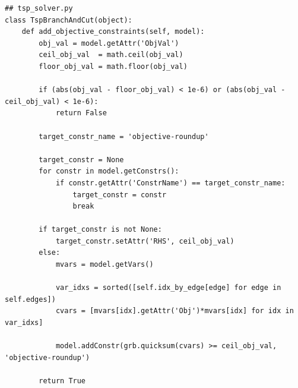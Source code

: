 \documentclass{article}
\begin{document}
\begin{flushleft}
\begin{lstlisting}
## tsp_solver.py
class TspBranchAndCut(object):
    def add_objective_constraints(self, model):
        obj_val = model.getAttr('ObjVal')
        ceil_obj_val  = math.ceil(obj_val)
        floor_obj_val = math.floor(obj_val)

        if (abs(obj_val - floor_obj_val) < 1e-6) or (abs(obj_val - ceil_obj_val) < 1e-6):
            return False

        target_constr_name = 'objective-roundup'

        target_constr = None
        for constr in model.getConstrs():
            if constr.getAttr('ConstrName') == target_constr_name:
                target_constr = constr
                break

        if target_constr is not None:
            target_constr.setAttr('RHS', ceil_obj_val)
        else:
            mvars = model.getVars()

            var_idxs = sorted([self.idx_by_edge[edge] for edge in self.edges])
            cvars = [mvars[idx].getAttr('Obj')*mvars[idx] for idx in var_idxs]

            model.addConstr(grb.quicksum(cvars) >= ceil_obj_val, 'objective-roundup')

        return True
\end{lstlisting}

\begin{flushleft}

\end{flushleft}



\end{flushleft}
\end{document}
